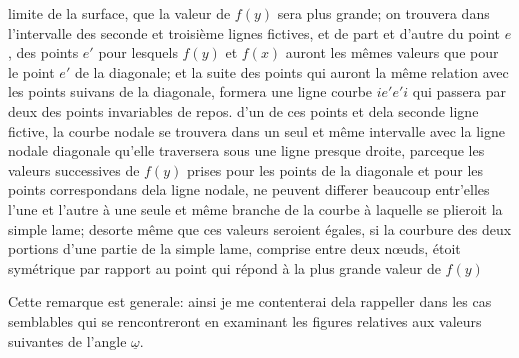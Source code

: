 \documentclass[11pt,a4paper]{article}
\begin{document}

limite de la surface, que  la valeur de $f(y)$ sera plus
grande;  on
trouvera dans l'intervalle des seconde et troisième lignes
fictives, et de part et d'autre du point $e$, des points
$e'$ pour lesquels $f(y)$ et $f(x)$ auront les mêmes valeurs
que pour le point $e'$ de la diagonale; et la suite des
points qui auront la même relation avec les points
suivans de la diagonale, formera une ligne courbe
$ie'e'i$ qui passera par deux des points invariables de
repos.   d'un de ces points et  dela
seconde ligne fictive, la courbe nodale se trouvera
dans un seul et même intervalle avec la ligne nodale
diagonale qu'elle traversera sous une ligne presque droite,
parceque les valeurs successives de $f(y)$ prises pour les
points de la diagonale et pour les points correspondans
dela ligne nodale, ne peuvent  differer beaucoup
entr'elles   l'une et l'autre
à une seule et même branche de la courbe à laquelle
se plieroit la simple lame; desorte même que ces valeurs
seroient égales, si la courbure des deux portions d'une
partie de la simple lame, comprise entre deux nœuds,
étoit symétrique par rapport au point 
qui répond à la plus grande valeur de $f(y)$


Cette remarque est generale: ainsi je me contenterai dela rappeller
dans les cas semblables qui se rencontreront en examinant les
figures relatives aux valeurs suivantes de l'angle $\underline{\omega}$.
\end{document}
